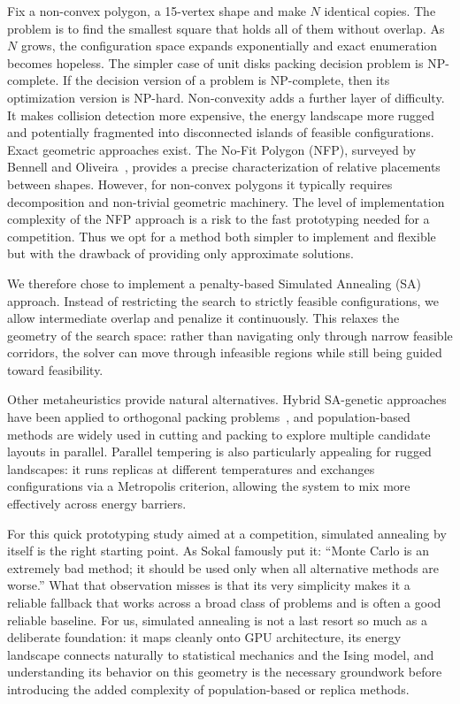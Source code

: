\documentclass[10pt]{article}
\begin{document}
Fix a non-convex polygon, a 15-vertex shape and make $N$ identical copies.
The problem is to find the smallest square that holds all of them
without overlap. As $N$ grows, the configuration space expands
exponentially and exact enumeration becomes hopeless.
The
simpler case of unit disks packing decision problem is
NP-complete. If the decision version of a problem is NP-complete,
then its optimization version is NP-hard.
Non-convexity adds a further layer of difficulty.
It makes collision detection more expensive, the energy landscape more
rugged and potentially fragmented into disconnected islands of 
feasible configurations.
Exact geometric approaches exist. The No-Fit Polygon (NFP), surveyed
by Bennell and Oliveira~\cite{bennell2008}, provides a precise
characterization of relative placements between shapes. However,
for non-convex polygons it typically requires decomposition and
non-trivial geometric machinery. 
The level of implementation complexity of the NFP approach
is a risk to the fast prototyping needed for a competition. Thus
we opt for a method both simpler to implement and flexible 
but with the drawback of providing only approximate solutions.

We therefore chose to implement a penalty-based Simulated Annealing (SA) approach.
Instead of restricting the search to strictly feasible configurations,
we allow intermediate overlap and penalize it continuously. This
relaxes the geometry of the search space: rather than navigating only
through narrow feasible corridors, the solver can move through
infeasible regions while still being guided toward feasibility.

Other metaheuristics provide natural alternatives. Hybrid SA-genetic
approaches have been applied to orthogonal packing problems~\cite{leung2003},
and population-based methods are widely used in cutting and packing
to explore multiple candidate layouts in parallel. Parallel tempering
is also particularly appealing for rugged landscapes: it runs replicas
at different temperatures and exchanges configurations via a Metropolis
criterion, allowing the system to mix more effectively across energy
barriers.

For this quick prototyping study aimed at a competition,
 simulated annealing by itself is the right starting point. As Sokal
famously put it: ``Monte Carlo is an extremely bad method; it should be
used only when all alternative methods are worse.'' What that observation
misses is that its very simplicity makes it a reliable fallback that
works across a broad class of problems and is often a good reliable baseline.
For us, simulated annealing is not a last resort so much as a deliberate foundation: it
maps cleanly onto GPU architecture, its energy landscape connects
naturally to statistical mechanics and the Ising model, and understanding
its behavior on this geometry is the necessary groundwork before
introducing the added complexity of population-based or replica methods.
\end{document}
